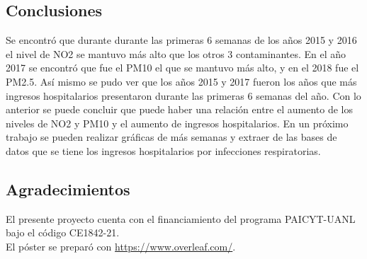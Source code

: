 \documentclass[a0]{sciposter} %
\begin{document}
\begin{multicols}{2}
\section{Conclusiones}
Se encontró que durante durante las primeras 6 semanas de los años 2015 y 2016 el nivel de NO2 se mantuvo más alto que los otros 3 contaminantes. En el año 2017 se encontró que fue el PM10 el que se mantuvo más alto, y en el 2018 fue el PM2.5. Así mismo se pudo ver que los años 2015 y 2017 fueron los años que más ingresos hospitalarios presentaron durante las primeras 6 semanas del año. 
Con lo anterior se puede concluir que puede haber una relación entre el aumento de los niveles de NO2 y PM10 y el aumento de ingresos hospitalarios.
En un próximo trabajo se pueden realizar gráficas de más semanas y extraer de las bases de datos que se tiene los ingresos hospitalarios por infecciones respiratorias.

\subsection*{Agradecimientos}

El presente proyecto cuenta con el financiamiento del programa PAICYT-UANL bajo el código CE1842-21.\\
El póster se preparó con \url{https://www.overleaf.com/}.



    
\end{multicols}
\end{document}
